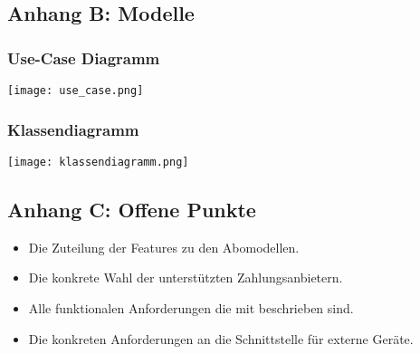 \subsection*{Anhang B: Modelle}\label{sec:app_modelle}
\subsubsection*{Use-Case Diagramm}
\texttt{[image: use\_case.png]}

\subsubsection*{Klassendiagramm}
\texttt{[image: klassendiagramm.png]}

\subsection*{Anhang C: Offene Punkte}

\begin{itemize}
	\item Die Zuteilung der Features zu den Abomodellen.
	\item Die konkrete Wahl der unterstützten Zahlungsanbietern.
	\item Alle funktionalen Anforderungen die mit  beschrieben sind.
	\item Die konkreten Anforderungen an die Schnittstelle für externe Geräte.
\end{itemize}

